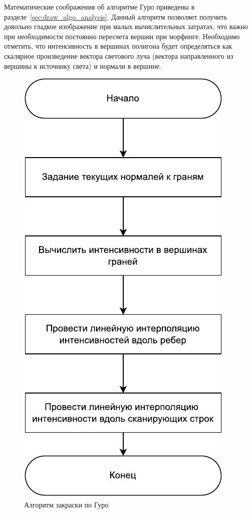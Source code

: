Математические соображения об алгоритме Гуро приведены в разделе~\ref{sec:draw_algo_analysis}.
Данный алгоритм позволяет получить довольно гладкое изображение при малых вычислительных затратах, что важно при необходимости постоянно пересчета вершин при морфинге.
Необходимо отметить, что интенсивность в вершинах полигона будет определяться как скалярное произведение вектора светового луча (вектора направленного из вершины к источнику света) и нормали в вершине.
\begin{figure}[h]
	\centering
	\includegraphics{images/guro_morph.pdf}
	\caption{Алгоритм закраски по Гуро}
	\label{fig:guro_algo}
\end{figure}

